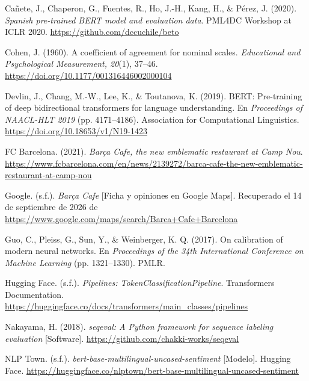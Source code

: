 \documentclass[12pt,a4paper]{article}
\newenvironment{referencias}
  {\begin{list}{}{%
     \setlength{\leftmargin}{1.6em}\setlength{\itemindent}{-1.6em}%
     \setlength{\labelwidth}{0pt}\setlength{\labelsep}{0pt}%
     \setlength{\itemsep}{0.7em}\setlength{\parsep}{0pt}}}
  {\end{list}}
\begin{document}
\begin{referencias}

\item Cañete, J., Chaperon, G., Fuentes, R., Ho, J.-H., Kang, H., \& Pérez, J. (2020).
\emph{Spanish pre-trained BERT model and evaluation data}. PML4DC Workshop at ICLR 2020.
\url{https://github.com/dccuchile/beto}

\item Cohen, J. (1960). A coefficient of agreement for nominal scales. \emph{Educational and
Psychological Measurement, 20}(1), 37--46. \url{https://doi.org/10.1177/001316446002000104}

\item Devlin, J., Chang, M.-W., Lee, K., \& Toutanova, K. (2019). BERT: Pre-training of deep
bidirectional transformers for language understanding. En \emph{Proceedings of NAACL-HLT 2019}
(pp. 4171--4186). Association for Computational Linguistics.
\url{https://doi.org/10.18653/v1/N19-1423}

\item FC Barcelona. (2021). \emph{Barça Cafe, the new emblematic restaurant at Camp Nou}.
\url{https://www.fcbarcelona.com/en/news/2139272/barca-cafe-the-new-emblematic-restaurant-at-camp-nou}

\item Google. (s.f.). \emph{Barça Cafe} [Ficha y opiniones en Google Maps]. Recuperado el 14 de
septiembre de 2026 de \url{https://www.google.com/maps/search/Barca+Cafe+Barcelona}

\item Guo, C., Pleiss, G., Sun, Y., \& Weinberger, K. Q. (2017). On calibration of modern neural
networks. En \emph{Proceedings of the 34th International Conference on Machine Learning}
(pp. 1321--1330). PMLR.

\item Hugging Face. (s.f.). \emph{Pipelines: TokenClassificationPipeline}. Transformers
Documentation. \url{https://huggingface.co/docs/transformers/main_classes/pipelines}

\item Nakayama, H. (2018). \emph{seqeval: A Python framework for sequence labeling evaluation}
[Software]. \url{https://github.com/chakki-works/seqeval}

\item NLP Town. (s.f.). \emph{bert-base-multilingual-uncased-sentiment} [Modelo]. Hugging Face.
\url{https://huggingface.co/nlptown/bert-base-multilingual-uncased-sentiment}


\end{referencias}
\end{document}
